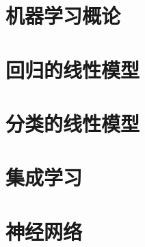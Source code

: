 \chapter{机器学习概论}





\chapter{回归的线性模型}






\chapter{分类的线性模型}





\chapter{集成学习}







\chapter{神经网络}








